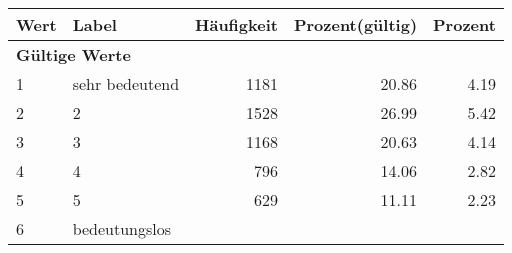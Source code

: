      \begin{longtable}{lXrrr}
     \toprule
     \textbf{Wert} & \textbf{Label} & \textbf{Häufigkeit} & \textbf{Prozent(gültig)} & \textbf{Prozent} \\
     \endhead
     \midrule
     \multicolumn{5}{l}{\textbf{Gültige Werte}}\\

     1 &
     \multicolumn{1}{X}{ sehr bedeutend   } &


       \num{1181} &
       \num[round-mode=places,round-precision=2]{20,86} &
         \num[round-mode=places,round-precision=2]{4,19} \\

     2 &
     \multicolumn{1}{X}{ 2   } &


       \num{1528} &
       \num[round-mode=places,round-precision=2]{26,99} &
         \num[round-mode=places,round-precision=2]{5,42} \\

     3 &
     \multicolumn{1}{X}{ 3   } &


       \num{1168} &
       \num[round-mode=places,round-precision=2]{20,63} &
         \num[round-mode=places,round-precision=2]{4,14} \\

     4 &
     \multicolumn{1}{X}{ 4   } &


       \num{796} &
       \num[round-mode=places,round-precision=2]{14,06} &
         \num[round-mode=places,round-precision=2]{2,82} \\

     5 &
     \multicolumn{1}{X}{ 5   } &


       \num{629} &
       \num[round-mode=places,round-precision=2]{11,11} &
         \num[round-mode=places,round-precision=2]{2,23} \\

     6 &
     \multicolumn{1}{X}{ bedeutungslos   } &



\end{longtable}
